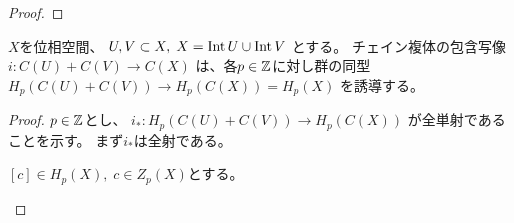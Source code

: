\documentclass[report]{jlreq}
\begin{document}
\begin{proof}
    \TODO{}
\end{proof}

\begin{lemma}
    $X$を位相空間、
    $U, V \subset X, \; X = \operatorname{Int} U \cup \operatorname{Int} V$
    とする。
    チェイン複体の包含写像
    $i \colon C(U) + C(V) \to C(X)$
    は、各$p \in \mathbb{Z}$に対し群の同型
    $H_p(C(U) + C(V)) \to H_p(C(X)) = H_p(X)$
    を誘導する。
\end{lemma}

\begin{proof}
    $p \in \mathbb{Z}$とし、
    $i_* \colon H_p(C(U) + C(V)) \to H_p(C(X))$
    が全単射であることを示す。
    まず$i_*$は全射である。
    \begin{innerproof}
        $[c] \in H_p(X), \; c \in Z_p(X)$とする。
        \TODO{}
    \end{innerproof}
\end{proof}
\end{document}
